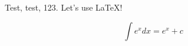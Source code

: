\documentclass[12pt]{article}
\begin{document}
Test, test, 123. Let's use \LaTeX!

$$\int e^x dx = e^x + c$$
\end{document}
